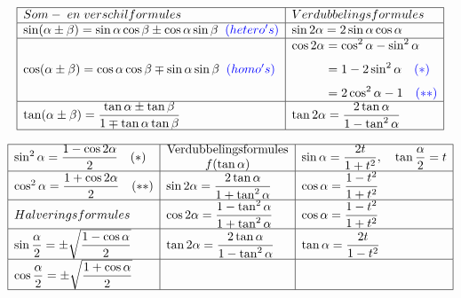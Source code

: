 \documentclass[a5paper]{article}
\begin{document}
\[
\begin{array}{|l|l|}
\hline
{\scriptsize {Som-\;en\;verschilformules}} & 
{\scriptsize {Verdubbelingsformules}} \\ \hline
\sin(\alpha \pm \beta) = \sin\alpha \cos\beta \pm \cos\alpha \sin\beta \;\; \textcolor{blue}{\scriptsize (hetero's)} & 
\sin 2\alpha = 2\sin\alpha \cos\alpha \\ \hline
\cos(\alpha \pm \beta) = \cos\alpha \cos\beta \mp \sin\alpha \sin\beta \;\; \textcolor{blue}{\scriptsize (homo's)} & 
\begin{aligned}
\cos 2\alpha &= \cos^2\alpha - \sin^2\alpha \\[4pt]
             &= 1 - 2\sin^2\alpha \quad \textcolor{blue}{\scriptsize (*)} \\[4pt]
             &= 2\cos^2\alpha - 1 \quad \textcolor{blue}{\scriptsize (**)}
\end{aligned} \\ \hline
\tan(\alpha \pm \beta) = \dfrac{\tan\alpha \pm \tan\beta}{1 \mp \tan\alpha \tan\beta} & 
\tan 2\alpha = \dfrac{2\tan\alpha}{1 - \tan^2\alpha} \\ \hline
\end{array}
\]


\[
\begin{array}{|l|l|l|}
\hline
\sin^2\alpha = \dfrac{1 - \cos 2\alpha}{2} \quad (*) & 
\parbox{3.5cm}{\centering Verdubbelingsformules \\ $f(\tan\alpha)$} & 
\sin\alpha = \dfrac{2t}{1 + t^2}, \quad \tan\dfrac{\alpha}{2} = t \\ \hline

\cos^2\alpha = \dfrac{1 + \cos 2\alpha}{2} \quad (**) & 
\sin 2\alpha = \dfrac{2\tan\alpha}{1 + \tan^2\alpha} & 
\cos\alpha = \dfrac{1 - t^2}{1 + t^2} \\ \hline

Halveringsformules & 
\cos 2\alpha = \dfrac{1 - \tan^2\alpha}{1 + \tan^2\alpha} & 
\cos\alpha = \dfrac{1 - t^2}{1 + t^2} \\ \hline

\sin\dfrac{\alpha}{2} = \pm\sqrt{\dfrac{1 - \cos\alpha}{2}} & 
\tan 2\alpha = \dfrac{2\tan\alpha}{1 - \tan^2\alpha} & 
\tan\alpha = \dfrac{2t}{1 - t^2} \\ \hline

\cos\dfrac{\alpha}{2} = \pm\sqrt{\dfrac{1 + \cos\alpha}{2}} & & \\ \hline
\end{array}
\]
\end{document}
